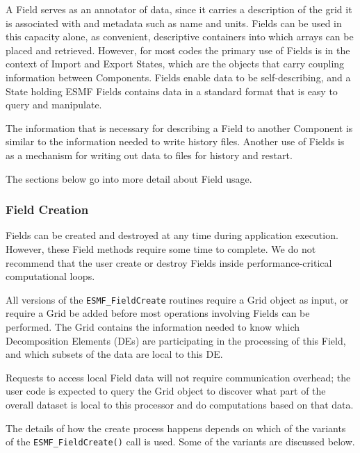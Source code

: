 

A Field serves as an annotator of data, since it carries 
a description of the grid it is associated with and metadata 
such as name and units.  Fields can be used in this capacity
alone, as convenient, descriptive containers into which arrays 
can be placed and retrieved.  However, for most codes the primary 
use of Fields is in the context of Import and Export States,
which are the objects that carry coupling information between 
Components.  Fields enable data to be self-describing, and a
State holding ESMF Fields contains data in a standard format
that is easy to query and manipulate.  

The information that is necessary for describing a Field to 
another Component is similar to the information needed to write 
history files.  Another use of Fields is as a mechanism for 
writing out data to files for history and restart.

The sections below go into more detail about Field usage.

\subsubsection{Field Creation}

Fields can be created and destroyed at any time during 
application execution.  However, these Field methods require 
some time to complete.  We do not recommend that the user
create or destroy Fields inside performance-critical 
computational loops.

All versions of the {\tt ESMF\_FieldCreate} 
routines require a Grid object as input, or require a Grid
be added before most operations involving Fields can be performed.
The Grid contains the information needed to know which 
Decomposition Elements (DEs) are participating in 
the processing of this Field, and which subsets of the data
are local to this DE.

Requests to access local Field data will not require 
communication overhead; the user code is expected to
query the Grid object to discover what part of the
overall dataset is local to this processor and do
computations based on that data.

The details of how the create process happens depends 
on which of the variants of the {\tt ESMF\_FieldCreate()} 
call is used.  Some of the variants are discussed below.

